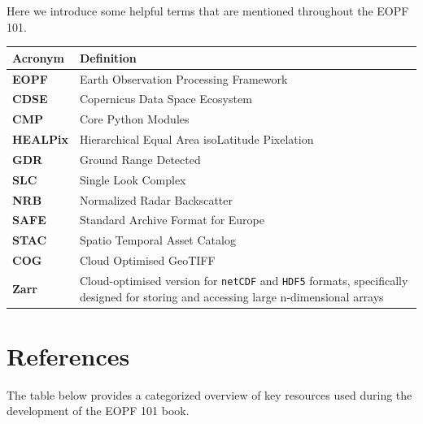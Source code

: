 \documentclass[
  letterpaper,
  DIV=11,
  numbers=noendperiod]{scrreprt}
\begin{document}
Here we introduce some helpful terms that are mentioned throughout the
EOPF 101.

\begin{longtable}[]{@{}
  >{\raggedright\arraybackslash}p{}
  >{\raggedright\arraybackslash}p{}@{}}
\toprule\noalign{}
\begin{minipage}[b]{\linewidth}\raggedright
Acronym
\end{minipage} & \begin{minipage}[b]{\linewidth}\raggedright
Definition
\end{minipage} \\
\midrule\noalign{}
\endhead
\bottomrule\noalign{}
\endlastfoot
\textbf{EOPF} & Earth Observation Processing Framework \\
\textbf{CDSE} & Copernicus Data Space Ecosystem \\
\textbf{CMP} & Core Python Modules \\
\textbf{HEALPix} & Hierarchical Equal Area isoLatitude Pixelation \\
\textbf{GDR} & Ground Range Detected \\
\textbf{SLC} & Single Look Complex \\
\textbf{NRB} & Normalized Radar Backscatter \\
\textbf{SAFE} & Standard Archive Format for Europe \\
\textbf{STAC} & Spatio Temporal Asset Catalog \\
\textbf{COG} & Cloud Optimised GeoTIFF \\
\textbf{Zarr} & Cloud-optimised version for \texttt{netCDF} and
\texttt{HDF5} formats, specifically designed for storing and accessing
large n-dimensional arrays \\
\end{longtable}


\chapter{\texorpdfstring{\textbf{References}}{References}}\label{references}

The table below provides a categorized overview of key resources used
during the development of the EOPF 101 book.
\end{document}
